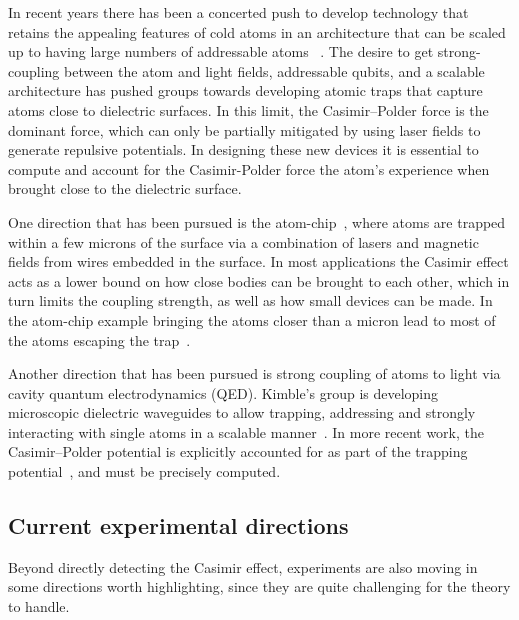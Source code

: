 In recent years there has been a concerted push to develop technology that retains the appealing features 
of cold atoms in an architecture that can be scaled up to having large numbers of addressable atoms
~\cite{Kimble2008}.  
The desire to get strong-coupling between the atom and light fields, addressable qubits, and a scalable
architecture has pushed groups towards developing atomic traps that capture atoms close to dielectric surfaces.  
In this limit, the Casimir--Polder force is the dominant force, which can only be partially mitigated
by using laser fields to generate repulsive potentials.
In designing these new devices it is essential to compute and account for the Casimir-Polder force
the atom's experience when brought close to the dielectric surface.  

One direction that has been pursued is the atom-chip~\cite{Folman2000,Schneider2003,Salem2010},
where atoms are trapped within a few microns of the surface via a combination of lasers and magnetic fields from wires embedded in
the surface.  %
In most applications the Casimir effect acts as a lower bound on how close bodies can be brought 
to each other, which in turn limits the coupling strength, as well as how small devices can be made.
In the atom-chip example bringing the atoms closer than a micron lead to most of the atoms escaping the 
trap~\cite{Lin2004}.

Another direction that has been pursued is strong coupling of atoms to light via cavity 
quantum electrodynamics (QED).  
Kimble's group is developing microscopic dielectric waveguides to allow trapping, addressing and strongly interacting with  
single atoms in a scalable manner~\cite{Alton2011, Hung2013, Goban2014}.  In more recent work,
the Casimir--Polder potential is explicitly accounted for as part of the trapping potential~\cite{Goban2014},
and must be precisely computed.

\subsection{Current experimental directions}

Beyond directly detecting the Casimir effect, experiments are also moving in some directions worth highlighting,
since they are quite challenging for the theory to handle.  

